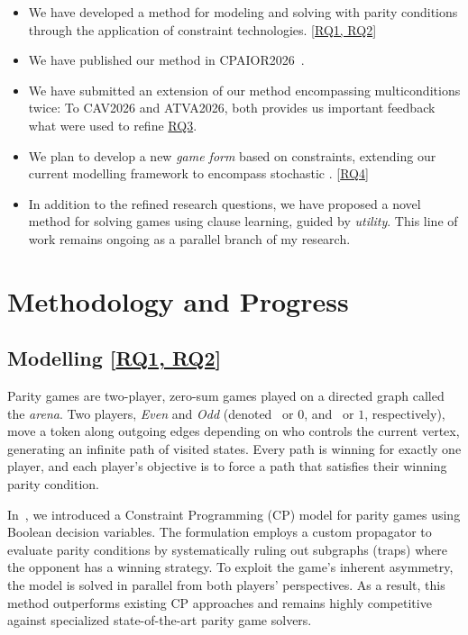 \documentclass{article}
\begin{document}
\begin{itemize}
  \item We have developed a method for modeling and solving \wregulargames with parity conditions through the application of constraint technologies. [\hyperref[sec:rq]{RQ1, RQ2}]
  \item We have published our method in CPAIOR2026~\cite{Hernandez:2026:noc}.
  \item We have submitted an extension of our method encompassing multiconditions twice: To CAV2026 and ATVA2026, both provides us important feedback what were used to refine \hyperref[sec:rq]{RQ3}.
  \item We plan to develop a new \textit{game form} based on constraints, extending our current modelling framework to encompass stochastic \wregulargames. [\hyperref[sec:rq]{RQ4}]
  \item In addition to the refined research questions, we have proposed a novel method for solving games using clause learning, guided by \textit{utility}. This line of work remains ongoing as a parallel branch of my research.
\end{itemize}

\section{Methodology and Progress}

\subsection{Modelling [\hyperref[sec:rq]{RQ1, RQ2}]}

Parity games are two-player, zero-sum games played on a directed graph called the \textit{arena}. Two players, \textit{Even} and \textit{Odd} (denoted~\even{} or $0$, and~\odd{} or $1$, respectively), move a token along outgoing edges depending on who controls the current vertex, generating an infinite path of visited states. Every path is winning for exactly one player, and each player's objective is to force a path that satisfies their winning parity condition.

In~\cite{Hernandez:2026:noc}, we introduced a Constraint Programming (CP) model for parity games using Boolean decision variables. The formulation employs a custom propagator to evaluate parity conditions by systematically ruling out subgraphs (traps) where the opponent has a winning strategy. To exploit the game's inherent asymmetry, the model is solved in parallel from both players' perspectives. As a result, this method outperforms existing CP approaches and remains highly competitive against specialized state-of-the-art parity game solvers.
\end{document}
